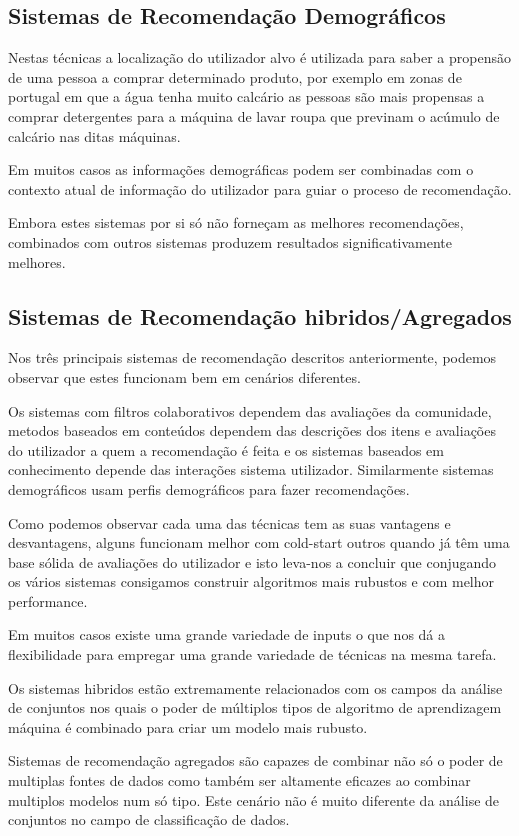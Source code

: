 \hfill
\subsection{Sistemas de Recomendação Demográficos}\hfill


 \par Nestas técnicas a localização do utilizador alvo é utilizada para saber a propensão de uma pessoa a comprar determinado produto, por exemplo em zonas de portugal em que a água tenha muito calcário as pessoas são mais propensas a comprar detergentes para a máquina de lavar roupa que previnam o acúmulo de calcário nas ditas máquinas.
 \par Em muitos casos as informações demográficas podem ser combinadas com o contexto atual de informação do utilizador para guiar o proceso de recomendação.
 \par Embora estes sistemas por si só não forneçam as melhores recomendações, combinados com outros sistemas produzem resultados significativamente melhores.
\hfill
\subsection{Sistemas de Recomendação hibridos/Agregados}
\hfill
 \par Nos três principais sistemas de recomendação descritos anteriormente, podemos observar que estes funcionam bem em cenários diferentes. 
 \par Os sistemas com filtros colaborativos dependem das avaliações da comunidade, metodos baseados em conteúdos dependem das descrições dos itens e avaliações do utilizador a quem a recomendação é feita e os sistemas baseados em conhecimento depende das interações sistema utilizador. Similarmente sistemas demográficos usam perfis demográficos para fazer recomendações.
 \par Como podemos observar cada uma das técnicas tem as suas vantagens e desvantagens, alguns funcionam melhor com cold-start outros quando já têm uma base sólida de avaliações do utilizador e isto leva-nos a concluir que conjugando os vários sistemas consigamos construir algoritmos mais rubustos e com melhor performance.
 \par Em muitos casos existe uma grande variedade de inputs o que nos dá a flexibilidade para empregar uma grande variedade de técnicas na mesma tarefa.
 \par Os sistemas hibridos estão extremamente relacionados com os campos da análise de conjuntos nos quais o poder de múltiplos tipos de algoritmo de aprendizagem máquina é combinado para criar um modelo mais rubusto.
 \par Sistemas de recomendação agregados são capazes de combinar não só o poder de multiplas fontes de dados como também ser altamente eficazes ao combinar multiplos modelos num só tipo. Este cenário não é muito diferente da análise de conjuntos no campo de classificação de dados.

